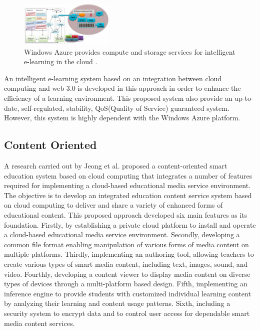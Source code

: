 \documentclass[journal]{vgtc}
\begin{document}
  \begin{figure}[t]
    \centering
    \includegraphics[width=0.4\textwidth]{win-azure}
    \caption{Windows Azure provides compute and storage services for intelligent e-learning in the cloud \cite{nasr2012proposed}.}
    \label{win-azure}
  \end{figure}

  An intelligent e-learning system based on an integration between cloud computing and web 3.0 is developed in this approach in order to enhance the efficiency of a learning environment. This proposed system also provide an up-to-date, self-regulated, stability, QoS(Quality of Service) guaranteed system. However, this system is highly dependent with the Windows Azure platform.

  \subsection{Content Oriented}
  A research carried out by Jeong et al. \cite{jeong2013cloud,jeong2013content} proposed a content-oriented smart education system based on cloud computing that integrates a number of features required for implementing a cloud-based educational media service environment. The objective is to develop an integrated education content service system based on cloud computing to deliver and share a variety of enhanced forms of educational content. This proposed approach developed six main features as its foundation. Firstly, by establishing a private cloud platform to install and operate a cloud-based educational media service environment. Secondly, developing a common file format enabling manipulation of various forms of media content on multiple platforms. Thirdly, implementing an authoring tool, allowing teachers to create various types of smart media content, including text, images, sound, and video. Fourthly, developing a content viewer to display media content on diverse types of devices through a multi-platform based design. Fifth, implementing an inference engine to provide students with customized individual learning content by analyzing their learning and content usage patterns. Sixth, including a security system to encrypt data and to control user access for dependable smart media content services.
\end{document}
